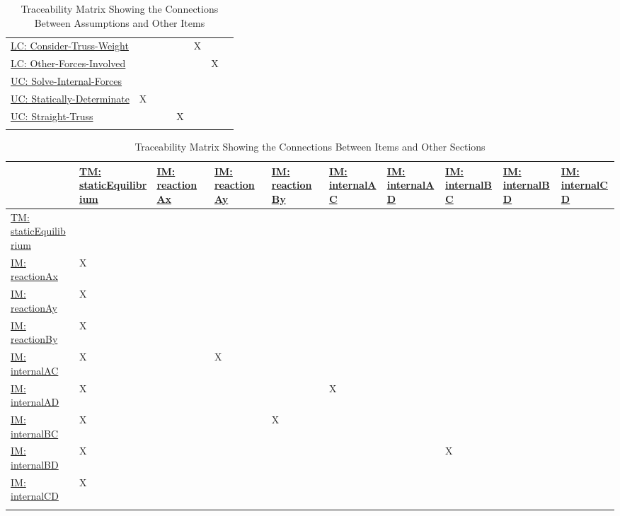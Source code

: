 \documentclass[12pt]{article}
\begin{document}
\begin{longtable}{l l l l l l l l}
\\
\hyperref[likeChgWoT]{LC: Consider-Truss-Weight} &  &  &  &  & X &  & 
\\
\hyperref[likeChgOtherF]{LC: Other-Forces-Involved} &  &  &  &  &  & X & 
\\
\hyperref[unlikeChgSIF]{UC: Solve-Internal-Forces} &  &  &  &  &  &  & 
\\
\hyperref[unlikeChgStatD]{UC: Statically-Determinate} & X &  &  &  &  &  & 
\\
\hyperref[unlikeChgST]{UC: Straight-Truss} &  &  &  & X &  &  & 
\\
\bottomrule
\caption{Traceability Matrix Showing the Connections Between Assumptions and Other Items}
\label{Table:TraceMatAvsAll}
\end{longtable}
\begin{longtable}{l l l l l l l l l l}
\toprule
\textbf{} & \textbf{\hyperref[TM:staticEquilibrium]{TM: staticEquilibrium}} & \textbf{\hyperref[IM:reactionAx]{IM: reactionAx}} & \textbf{\hyperref[IM:reactionAy]{IM: reactionAy}} & \textbf{\hyperref[IM:reactionBy]{IM: reactionBy}} & \textbf{\hyperref[IM:internalAC]{IM: internalAC}} & \textbf{\hyperref[IM:internalAD]{IM: internalAD}} & \textbf{\hyperref[IM:internalBC]{IM: internalBC}} & \textbf{\hyperref[IM:internalBD]{IM: internalBD}} & \textbf{\hyperref[IM:internalCD]{IM: internalCD}}
\\
\midrule
\endhead
\hyperref[TM:staticEquilibrium]{TM: staticEquilibrium} &  &  &  &  &  &  &  &  & 
\\
\hyperref[IM:reactionAx]{IM: reactionAx} & X &  &  &  &  &  &  &  & 
\\
\hyperref[IM:reactionAy]{IM: reactionAy} & X &  &  &  &  &  &  &  & 
\\
\hyperref[IM:reactionBy]{IM: reactionBy} & X &  &  &  &  &  &  &  & 
\\
\hyperref[IM:internalAC]{IM: internalAC} & X &  & X &  &  &  &  &  & 
\\
\hyperref[IM:internalAD]{IM: internalAD} & X &  &  &  & X &  &  &  & 
\\
\hyperref[IM:internalBC]{IM: internalBC} & X &  &  & X &  &  &  &  & 
\\
\hyperref[IM:internalBD]{IM: internalBD} & X &  &  &  &  &  & X &  & 
\\
\hyperref[IM:internalCD]{IM: internalCD} & X &  &  &  &  &  &  &  & 
\\
\bottomrule
\caption{Traceability Matrix Showing the Connections Between Items and Other Sections}
\label{Table:TraceMatRefvsRef}
\end{longtable}
\end{document}
